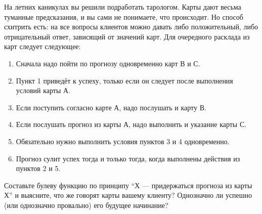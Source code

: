 \question
На летних каникулах вы решили подработать тарологом. Карты дают весьма туманные предсказания, и вы сами не понимаете, что происходит. Но способ схитрить есть: на все вопросы клиентов можно давать либо положительный, либо отрицательный ответ, зависящий от значений карт. Для очередного расклада из карт следует следующее:

\begin{enumerate}
\item Сначала надо пойти по прогнозу одновременно карт В и С.
\item Пункт 1 приведёт к успеху, только если он следует после выполнения условий карты А.
\item Если поступить согласно карте А, надо послушать и карту В.
\item Если послушать прогноз из карты А, надо выполнить и указание карты С.
\item Обязательно нужно выполнить условия пунктов 3 и 4 одновременно.
\item Прогноз сулит успех тогда и только тогда, когда выполнены действия из пунктов 2 и 5.
\end{enumerate}

Составьте булеву функцию по принципу “Х — придержаться прогноза из карты Х” и выясните, что же говорят карты вашему клиенту? Однозначно ли успешно (или однозначно провально) его будущее начинание?